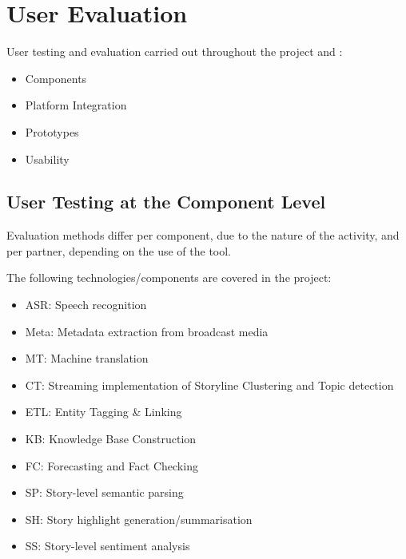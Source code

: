 \section{User Evaluation}\label{sec-user-evaluation}

User testing and evaluation  carried out throughout the project and 
:
\begin{itemize}
\item Components
\item Platform Integration
\item Prototypes
\item Usability 
\end{itemize}


\subsection{User Testing at the Component Level}



Evaluation methods differ per component, due to the nature of the activity, and per partner, depending on the use of the tool. 


The following technologies/components are covered in the project:
\begin{itemize}
\item ASR: Speech recognition
\item Meta: Metadata extraction from broadcast media
\item MT: Machine translation
\item CT: Streaming implementation of Storyline Clustering and Topic detection 
\item ETL: Entity Tagging \& Linking 
\item KB: Knowledge Base Construction
\item FC: Forecasting and Fact Checking
\item SP: Story-level semantic parsing 
\item SH: Story highlight generation/summarisation
\item SS: Story-level sentiment analysis
\end{itemize}


